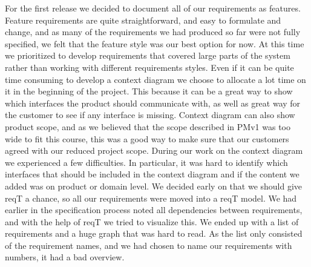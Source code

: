 \documentclass[10pt]{article}
\begin{document}
\newline
\indent For the first release we decided to document all of our requirements as features. Feature requirements are quite straightforward, and easy to formulate and change, and as many of the requirements we had produced so far were not fully specified, we felt that the feature style was our best option for now. At this time we prioritized to develop requirements that covered large parts of the system rather than working with different requirements styles.
\newline
\indent Even if it can be quite time consuming to develop a context diagram we choose to allocate a lot time on it in the beginning of the project. This because it can be a great way to show which interfaces the product should communicate with, as well as great way for the customer to see if any interface is missing. Context diagram can also show product scope, and as we believed that the scope described in PMv1 \cite{pmv1} was too wide to fit this course, this was a good way to make sure that our customers agreed with our reduced project scope. During our work on the context diagram we experienced a few difficulties. In particular, it was hard to identify which interfaces that should be included in the context diagram and if the content we added was on product or domain level. 
\newline
\indent
\indent We decided early on that we should give reqT a chance, so all our requirements were moved into a reqT model. We had earlier in the specification process noted all dependencies between requirements, and with the help of reqT we tried to visualize this. We ended up with a list of requirements and a huge graph that was hard to read. As the list only consisted of the requirement names, and we had chosen to name our requirements with numbers, it had a bad overview. 
\end{document}
